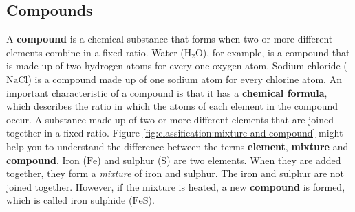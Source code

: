  
      \label{m38708*uid26}
            \subsection*{Compounds}
            \nopagebreak
 \label{m38708*id63363}A \textbf{compound} is a chemical substance that forms when two or more different elements combine in a fixed ratio. Water ($\text{H}_{2}\text{O}$), for example, is a compound that is made up of two hydrogen atoms for every one oxygen atom. Sodium chloride ($\text{NaCl}$) is a compound made up of one sodium atom for every chlorine atom. An important characteristic of a compound is that it has a \textbf{chemical formula}, which describes the ratio in which the atoms of each element in the compound occur.
 { A substance made up of two or more different elements that are joined together in a fixed ratio.} 
Figure \ref{fig:classification:mixture and compound} might help you to understand the difference between the terms \textbf{element}, \textbf{mixture} and \textbf{compound}. Iron ($\text{Fe}$) and sulphur ($\text{S}$) are two elements. When they are added together, they form a \textsl{mixture} of iron and sulphur. The iron and sulphur are not joined together. However, if the mixture is heated, a new \textbf{compound} is formed, which is called iron sulphide ($\text{FeS}$). \par 
